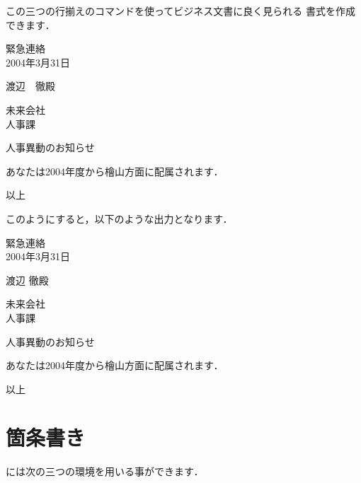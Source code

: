 {%
この三つの行揃えのコマンドを使ってビジネス文書に良く見られる
書式を作成できます．

\begin{InText}
\begin{flushright} 
   緊急連絡 \\    2004年3月31日
\end{flushright}
\begin{flushleft} 
   渡辺　徹殿
\end{flushleft}
\begin{flushright} 
   未来会社\\    人事課
\end{flushright}
\begin{center}
   人事異動のお知らせ
\end{center}
あなたは2004年度から檜山方面に配属されます．
\begin{flushright}  以上  \end{flushright}
\end{InText}

このようにすると，以下のような出力となります．


\begin{OutText}
\begin{flushright} 緊急連絡 \\ 2004年3月31日\end{flushright}
\begin{flushleft}  渡辺 徹殿                \end{flushleft}
\begin{flushright} 未来会社\\ 人事課    \end{flushright}
\begin{center}     人事異動のお知らせ       \end{center}
あなたは2004年度から檜山方面に配属されます．
\begin{flushright} 以上                     \end{flushright}
\end{OutText}

\section{箇条書き} 

には次の三つの環境を用いる事ができます．

}
